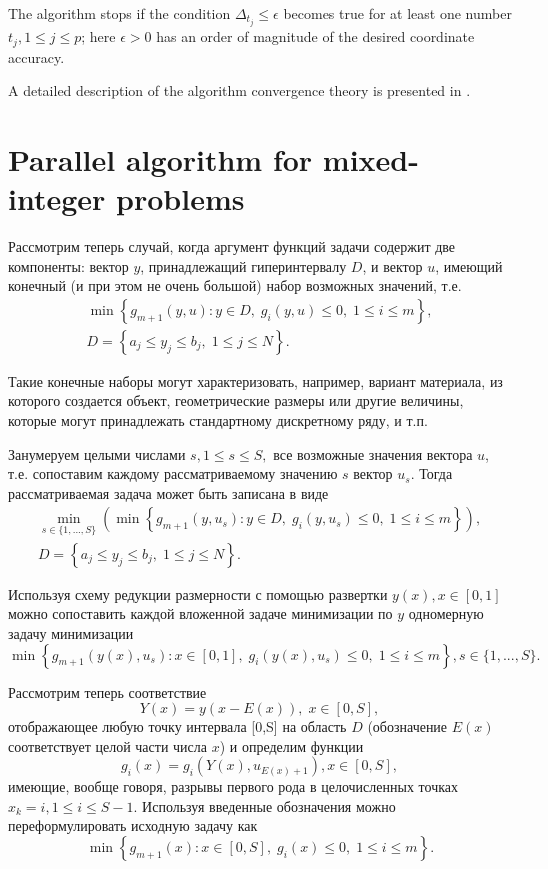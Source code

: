 \documentclass{llncs}
\begin{document}
\begin{enumerate}
\end{enumerate}

The algorithm stops if the condition $\Delta_{t_j}\leq \epsilon$ becomes true for at least one number $t_j, 1\leq j \leq p$; here  $\epsilon>0$ has an order of magnitude of the desired coordinate accuracy.

A detailed description of the algorithm convergence theory is presented in \cite{Strongin2000}.

\section{Parallel algorithm for mixed-integer problems}

Рассмотрим теперь случай, когда аргумент функций задачи содержит две компоненты: вектор $y$, принадлежащий гиперинтервалу $D$, и вектор $u$, имеющий конечный (и при этом не очень большой) набор возможных значений, т.е. 
\begin{gather}\label{problem_i}
\min{\left\{ g_{m+1}(y,u):y\in D, \; g_i(y,u)\leq 0, \; 1 \leq i \leq m\right\}},\\
D=\left\{a_j\leq y_j \leq b_j, \; 1\leq j \leq N \right\}.\nonumber
\end{gather}

Такие конечные наборы могут характеризовать, например, вариант материала, из которого создается объект, геометрические размеры или другие величины, которые могут принадлежать стандартному дискретному ряду, и т.п.

Занумеруем целыми числами $s, 1\leq s \leq S,$ все возможные значения вектора $u$, т.е. сопоставим каждому рассматриваемому значению $s$ вектор $u_s$. 
Тогда рассматриваемая задача может быть записана в виде 
\begin{gather}\label{problem_is}
 \min_{s\in\{1,...,S\}}\left(\min{\left\{ g_{m+1}(y,u_s):y\in D, \; g_i(y,u_s)\leq 0, \; 1 \leq i \leq m\right\}}\right),\\
D=\left\{ a_j\leq y_j \leq b_j, \; 1 \leq j\leq N \right\}.\nonumber 
\end{gather}

Используя схему редукции размерности с помощью развертки $y(x), x\in [0,1]$ можно сопоставить каждой вложенной задаче минимизации по $y$ одномерную задачу минимизации
\[
 \min{\left\{ g_{m+1}(y(x),u_s):x \in [0,1], \; g_i(y(x),u_s)\leq 0, \; 1 \leq i \leq m\right\}}, s\in\{1,...,S\}.
\]

Рассмотрим теперь соответствие 
\[
Y(x)=y(x-E(x)), \; x\in[0,S],
\]
отображающее любую точку интервала [0,S] на область $D$ (обозначение $E(x)$ соответствует целой части числа $x$) и определим функции 
\[
g_i(x) = g_i(Y(x),u_{E(x)+1}), x\in[0,S],
\]
имеющие, вообще говоря, разрывы первого рода в целочисленных точках $x_k = i, 1\leq i \leq S-1$.
Используя введенные обозначения можно переформулировать исходную задачу как
\begin{equation}\label{problem_is1}
\min \left\{g_{m+1}(x): x \in [0,S], \; g_i(x) \leq 0, \; 1 \leq i \leq m\right\}.
\end{equation}
\end{document}
